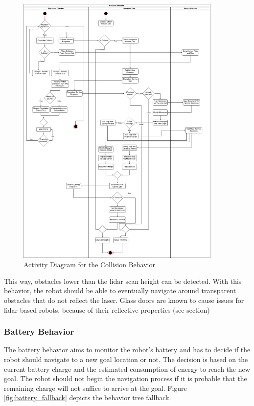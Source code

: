 %


\begin{figure}[ht!]
	\centering
	\includegraphics[width=0.90\textwidth]{images/activity_diagram_collision.png}
	\caption{Activity Diagram for the Collision Behavior}
	\label{fig:activity_diagram_collision}
\end{figure}

This way, obstacles lower than the lidar scan height can be detected. With this behavior, the robot should be able to eventually navigate around transparent obstacles that do not reflect the laser. Glass doors are known to cause issues for lidar-based robots, because of their reflective properties (see section)

\subsubsection{Battery Behavior}

The battery behavior aims to monitor the robot's battery and has to decide if the robot should navigate to a new goal location or not. The decision is based on the current battery charge and the estimated consumption of energy to reach the new goal. The robot should not begin the navigation process if it is probable that the remaining charge will not suffice to arrive at the goal. Figure \ref{fig:battery_fallback} depicts the behavior tree fallback.

